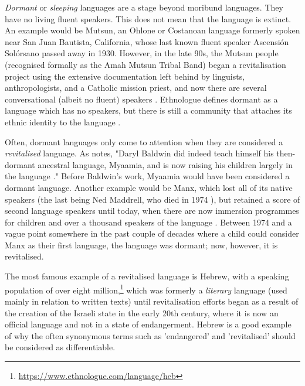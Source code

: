 \emph{Dormant} or \textit{sleeping} languages are a stage beyond moribund languages. They have no living fluent speakers. This does not mean that the language is extinct. An example would be Mutsun, an Ohlone or Costanoan language formerly spoken near San Juan Bautista, California, whose last known fluent speaker Ascensi\'on Sol\'orsano passed away in 1930. However, in the late 90s, the Mutsun people (recognised formally as the Amah Mutsun Tribal Band) began a revitalisation project using the extensive documentation left behind by linguists, anthropologists, and a Catholic mission priest, and now there are several conversational (albeit no fluent) speakers \citep{warner2007ethics}. Ethnologue defines dormant as a language which has no speakers, but there is still a community that attaches its ethnic identity to the language \citep{lewis2010assessing}.

Often, dormant languages only come to attention when they are considered a \textit{revitalised} language. As \citet{warner2007ethics} notes, "Daryl Baldwin did indeed teach himself his then-dormant ancestral language, Myaamia, and is now raising his children largely in the language \citep{hinton2001sleeping, leonard2004acquisition}." Before Baldwin's work, Myaamia would have been considered a dormant language. Another example would be Manx, which lost all of its native speakers (the last being Ned Maddrell, who died in 1974 \citep{wilson2008revitalization}), but retained a score of second language speakers until today, when there are now immersion programmes for children and over a thousand speakers of the language \citep{clague2009manx}. Between 1974 and a vague point somewhere in the past couple of decades where a child could consider Manx as their first language, the language was dormant; now, however, it is revitalised.

The most famous example of a revitalised language is Hebrew, with a speaking population of over eight million,\footnote{\href{https://www.ethnologue.com/language/heb}{https://www.ethnologue.com/language/heb}} which was formerly a {\it literary} language (used mainly in relation to written texts) until revitalisation efforts began as a result of the creation of the Israeli state in the early 20th century, where it is now an official language and not in a state of endangerment. Hebrew is a good example of why the often synonymous terms such as 'endangered' and 'revitalised' should be considered as differentiable.


